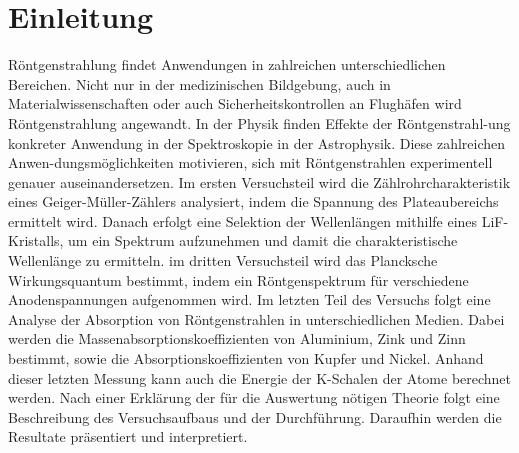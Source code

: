 \section{Einleitung}
Röntgenstrahlung findet Anwendungen in zahlreichen unterschiedlichen Bereichen. Nicht nur in der medizinischen Bildgebung, auch in Materialwissenschaften oder auch Sicherheitskontrollen an Flughäfen wird Röntgenstrahlung angewandt.  In der Physik finden Effekte der Röntgenstrahl-ung konkreter Anwendung in der Spektroskopie in der Astrophysik. Diese zahlreichen Anwen-dungsmöglichkeiten motivieren, sich mit Röntgenstrahlen experimentell genauer auseinandersetzen. Im ersten Versuchsteil wird die Zählrohrcharakteristik eines Geiger-Müller-Zählers analysiert, indem die Spannung des Plateaubereichs ermittelt wird. Danach erfolgt eine Selektion der Wellenlängen mithilfe eines LiF-Kristalls, um ein Spektrum aufzunehmen und damit die charakteristische Wellenlänge zu ermitteln. im dritten Versuchsteil wird das Plancksche Wirkungsquantum bestimmt, indem ein Röntgenspektrum für verschiedene Anodenspannungen aufgenommen wird. Im letzten Teil des Versuchs folgt eine Analyse der Absorption von Röntgenstrahlen in unterschiedlichen Medien. Dabei werden die Massenabsorptionskoeffizienten von Aluminium, Zink und Zinn bestimmt, sowie die Absorptionskoeffizienten von Kupfer und Nickel. Anhand dieser letzten Messung kann auch die Energie der K-Schalen der Atome berechnet werden.  
Nach einer Erklärung der für die Auswertung nötigen Theorie folgt eine Beschreibung des Versuchsaufbaus und der Durchführung. Daraufhin werden die Resultate präsentiert und interpretiert.

